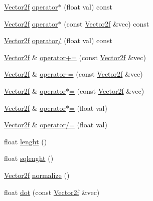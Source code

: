 \begin{DoxyCompactItemize}
\hyperlink{classh2_1_1_vector2f}{Vector2f} \hyperlink{classh2_1_1_vector2f_a499ef9942d6f5762fa225bcd8b6ed25b}{operator$\ast$} (float val) const 
\item 
\hyperlink{classh2_1_1_vector2f}{Vector2f} \hyperlink{classh2_1_1_vector2f_ab9bb7a389fd6ac9a9c37d176ac563b37}{operator$\ast$} (const \hyperlink{classh2_1_1_vector2f}{Vector2f} \&vec) const 
\item 
\hyperlink{classh2_1_1_vector2f}{Vector2f} \hyperlink{classh2_1_1_vector2f_a7eec76ff71312f3c1d433bb75dda4cbd}{operator/} (float val) const 
\item 
\hyperlink{classh2_1_1_vector2f}{Vector2f} \& \hyperlink{classh2_1_1_vector2f_a76cfbfe5e313838b41db65cde83405cc}{operator+=} (const \hyperlink{classh2_1_1_vector2f}{Vector2f} \&vec)
\item 
\hyperlink{classh2_1_1_vector2f}{Vector2f} \& \hyperlink{classh2_1_1_vector2f_a081ae075edaeace09fcfdc8bef5ea731}{operator-\/=} (const \hyperlink{classh2_1_1_vector2f}{Vector2f} \&vec)
\item 
\hyperlink{classh2_1_1_vector2f}{Vector2f} \& \hyperlink{classh2_1_1_vector2f_af25386b052dc1ee07bff8705ac03a05e}{operator$\ast$=} (const \hyperlink{classh2_1_1_vector2f}{Vector2f} \&vec)
\item 
\hyperlink{classh2_1_1_vector2f}{Vector2f} \& \hyperlink{classh2_1_1_vector2f_adedd26fe6446f9ebc0cebd752adcb0e3}{operator$\ast$=} (float val)
\item 
\hyperlink{classh2_1_1_vector2f}{Vector2f} \& \hyperlink{classh2_1_1_vector2f_a0279cd16573eb44d7d2c9da00b6d0795}{operator/=} (float val)
\item 
float \hyperlink{classh2_1_1_vector2f_ae5afbc0ba66ef74fe26e2035b9f76f45}{lenght} ()
\item 
float \hyperlink{classh2_1_1_vector2f_afa253aec68ca9e8b5cae30821d81ed38}{sqlenght} ()
\item 
\hyperlink{classh2_1_1_vector2f}{Vector2f} \hyperlink{classh2_1_1_vector2f_adf26db8f0a58623042415ccc69acc67b}{normalize} ()
\item 
float \hyperlink{classh2_1_1_vector2f_af23d1cd7e75575b3ab103e12b021bb35}{dot} (const \hyperlink{classh2_1_1_vector2f}{Vector2f} \&vec)
\end{DoxyCompactItemize}
